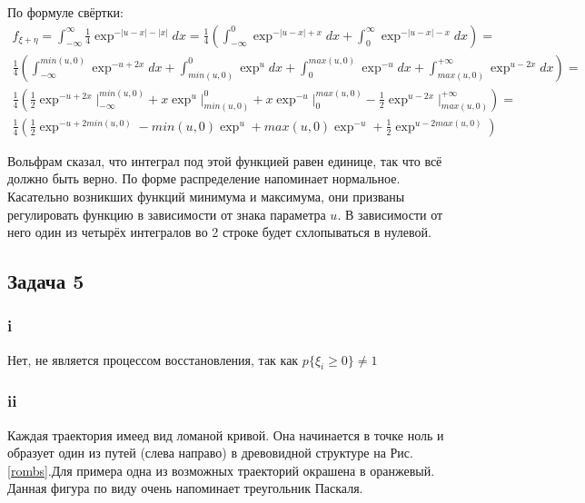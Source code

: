 \documentclass[a4paper,12pt]{article}
\begin{document}
По формуле свёртки:
\begin{equation*}
\begin{aligned}
f_{\xi + \eta} = \int_{-\infty}^{\infty} \frac{1}{4} \exp^{-|u-x|-|x|} dx=  \frac{1}{4}  \left( \int_{-\infty}^{0} \exp^{-|u-x|+x} dx + \int_{0}^{\infty}  \exp^{-|u-x|-x} dx \right) = \\ \frac{1}{4} \left( \int_{-\infty}^{min(u,0)} \exp^{-u+2x} dx+ \int_{min(u,0)}^{0} \exp^{u} dx+ \int_{0}^{max(u,0)}  \exp^{-u} dx + \int_{max(u,0)}^{+\infty}  \exp^{u-2x} dx \right) = \\
\frac{1}{4} \left( \frac{1}{2}\exp^{-u+2x} \Biggr|_{-\infty}^{min(u,0)}  + x \exp^u \Biggr|_{min(u,0)}^{0} + x \exp^{-u} \Biggr|_{0}^{max(u, 0)}  - \frac{1}{2} \exp^{u-2x} \Biggr|_{max(u, 0)}^{+\infty} \right) = \\
\frac{1}{4} \left( \frac{1}{2}\exp^{-u+2min(u,0)} - min(u,0) \exp^u + max(u,0) \exp^{-u} + \frac{1}{2} \exp^{u-2max(u, 0)} \right)
\end{aligned}
\end{equation*}

Вольфрам сказал, что интеграл под этой функцией равен единице, так что всё должно быть верно. По форме распределение напоминает нормальное. Касательно возникших функций минимума и максимума, они призваны регулировать функцию в зависимости от знака параметра $ u $. В зависимости от него один из четырёх интегралов во 2 строке будет схлопываться в нулевой.

\subsection{Задача 5}

\subsubsection{i}

Нет, не является процессом восстановления, так как $ p\{ \xi_i \ge 0 \} \neq 1 $

\subsubsection{ii}
Каждая траектория имеед вид ломаной кривой. Она начинается в точке ноль и образует один из путей (слева направо) в древовидной структуре на Рис.  \ref{rombs}.Для примера одна из возможных траекторий окрашена в оранжевый. Данная фигура по виду очень напоминает треугольник Паскаля.
\end{document}
